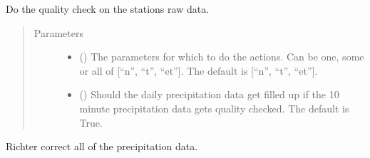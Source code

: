 \documentclass[letterpaper,10pt,english]{sphinxmanual}
\begin{document}
\begin{fulllineitems}
\begin{fulllineitems}
\label{\detokenize{weatherDB:weatherDB.broker.Broker.quality_check}}
\sphinxAtStartPar
Do the quality check on the stations raw data.
\begin{quote}\begin{description}
\item[{Parameters}] \leavevmode\begin{itemize}
\item {} 
\sphinxAtStartPar
{} (\sphinxstyleliteralemphasis{\sphinxupquote{, }}) \textendash{} The parameters for which to do the actions.
Can be one, some or all of {[}“n”, “t”, “et”{]}.
The default is {[}“n”, “t”, “et”{]}.

\item {} 
\sphinxAtStartPar
{} (\sphinxstyleliteralemphasis{\sphinxupquote{, }}) \textendash{} Should the daily precipitation data get filled up if the 10 minute precipitation data gets quality checked.
The default is True.

\end{itemize}

\end{description}\end{quote}

\end{fulllineitems}


\begin{fulllineitems}
\label{\detokenize{weatherDB:weatherDB.broker.Broker.richter_correct}}
\sphinxAtStartPar
Richter correct all of the precipitation data.

\end{fulllineitems}


\end{fulllineitems}
\end{document}
